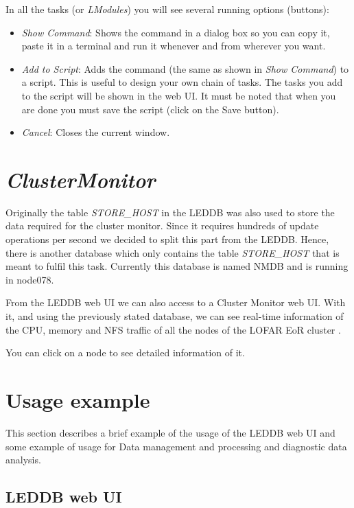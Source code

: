 \documentclass[a4paper,11pt]{article}
\begin{document}
In all the tasks (or \textit{LModules}) you will see several running options (buttons):

\begin{itemize}
	\item \textit{Show Command}: Shows the command in a dialog box so you can copy it, paste it in a terminal and run it whenever and from wherever you want.
	
	\item \textit{Add to Script}: Adds the command (the same as shown in \textit{Show Command}) to a script. This is useful to design your own chain of tasks. The tasks you add to the script will be shown in the web UI. It must be noted that when you are done you must save the script (click on the Save button).
	
	\item \textit{Cancel}: Closes the current window. 
\end{itemize} 

\section{\textit{ClusterMonitor}}
\label{sec:cm}

Originally the table \textit{STORE\_HOST} in the LEDDB was also used to store the data required for the cluster monitor. Since it requires hundreds of update operations per second we decided to split this part from the LEDDB. Hence, there is another database which only contains the table \textit{STORE\_HOST} that is meant to fulfil this task. Currently this database is named NMDB and is running in node078.

From the LEDDB web UI we can also access to a Cluster Monitor web UI. With it, and using the previously stated database, we can see real-time information of the CPU, memory and NFS traffic of all the nodes of the LOFAR EoR cluster .

You can click on a node to see detailed information of it.

\pagebreak  

\section{Usage example}
\label{sec:usageexample}

This section describes a brief example of the usage of the LEDDB web UI and some example of usage for Data management and processing and diagnostic data analysis.

\subsection{LEDDB web UI}
\end{document}
